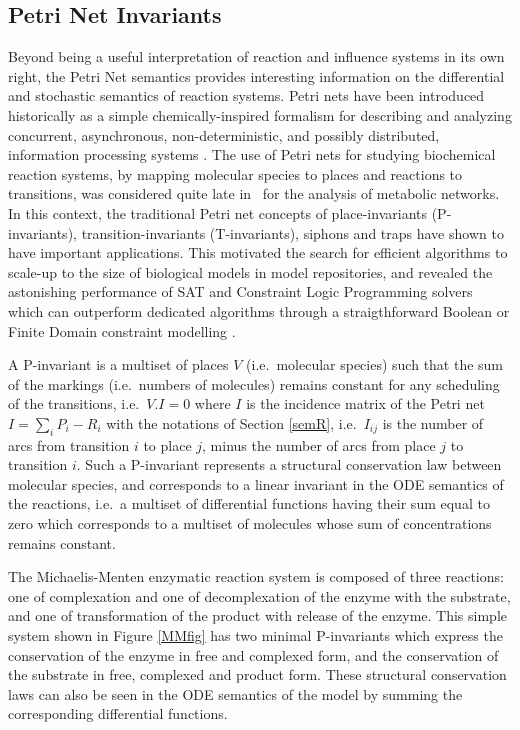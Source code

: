 \documentclass[graybox]{svmult}
\begin{document}

\subsection{Petri Net Invariants}\label{PN}

Beyond being a useful interpretation of reaction and influence systems in its own right,
the Petri Net semantics provides interesting information on the differential and stochastic semantics of reaction systems.
Petri nets have been introduced historically as a simple chemically-inspired formalism
for describing and analyzing concurrent, asynchronous,
non-deterministic, and possibly distributed, information processing systems \cite{Peterson81book}.
The use of Petri nets for studying biochemical reaction systems, 
by mapping molecular species to places and reactions to transitions,
was considered quite late in~\cite{RML93ismb} for the analysis of metabolic networks.
In this context, the traditional Petri net concepts of place-invariants (P-invariants), transition-invariants (T-invariants),
siphons and traps have shown to have important applications.
This motivated the search for efficient algorithms to scale-up to the size of biological models in model repositories,
and revealed the astonishing performance of SAT and Constraint Logic Programming solvers
which can outperform dedicated algorithms through a straigthforward Boolean or Finite Domain constraint modelling \cite{Soliman12amb,NMFS16constraints}.

A P-invariant is a multiset of places $V$ (i.e.~molecular species) such that the sum of the markings (i.e.~numbers of molecules) remains constant
for any scheduling of the transitions,
i.e.~$V.I=0$ where $I$ 
is the incidence matrix of the Petri net $I=\sum_i P_i-R_i$ with the notations of Section \ref{semR}, i.e.~$I_{ij}$ is the number of arcs from transition $i$ to place $j$, minus the number of arcs from place $j$ to transition $i$.
Such a P-invariant represents a structural conservation law between molecular species,
and corresponds to a linear invariant in the ODE semantics of the reactions,
i.e.~a multiset of differential functions having their sum equal to zero which corresponds to a multiset of molecules whose sum of concentrations remains constant.

\begin{example}\label{MM}
  The Michaelis-Menten enzymatic reaction system is composed of three reactions:
  one of complexation and one of decomplexation of the enzyme with the substrate,
  and one of transformation of the product with release of the enzyme.
  This simple system shown in Figure \ref{MMfig} has two minimal P-invariants which express the conservation of the enzyme in free and complexed form,
  and the conservation of the substrate in free, complexed and product form.
  These structural conservation laws can also be seen in the ODE semantics of the model by summing the corresponding differential functions.
\end{example}
\end{document}
